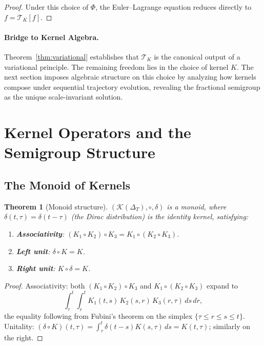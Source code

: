 \documentclass[12pt]{article}
\newtheorem{theorem}{Theorem}[section]
\newcommand{\Kcal}{\mathcal{K}}
\newcommand{\TK}{\mathcal{T}_K}
\begin{document}
\begin{proof}
Under this choice of $\Phi$, the Euler--Lagrange equation reduces directly
to $f = \TK[f]$.
\end{proof}

\paragraph{Bridge to Kernel Algebra.}
Theorem~\ref{thm:variational} establishes that $\TK$ is the canonical
output of a variational principle. The remaining freedom lies in the choice
of kernel $K$. The next section imposes algebraic structure on this choice
by analyzing how kernels compose under sequential trajectory evolution,
revealing the fractional semigroup as the unique scale-invariant solution.

\section{Kernel Operators and the Semigroup Structure}
\label{sec:semigroup}

\subsection{The Monoid of Kernels}

\begin{theorem}[Monoid structure]
\label{thm:monoid}
$(\Kcal(\Delta_T), \circ, \delta)$ is a monoid, where $\delta(t,\tau) =
\delta(t-\tau)$ (the Dirac distribution) is the identity kernel, satisfying:
\begin{enumerate}[label=(\roman*)]
\item \textbf{Associativity}: $(K_1 \circ K_2)\circ K_3 =
  K_1\circ(K_2\circ K_3)$.
\item \textbf{Left unit}: $\delta \circ K = K$.
\item \textbf{Right unit}: $K \circ \delta = K$.
\end{enumerate}
\end{theorem}

\begin{proof}
Associativity: both $(K_1\circ K_2)\circ K_3$ and $K_1\circ(K_2\circ K_3)$
expand to
\[
  \int_\tau^t\!\int_r^t K_1(t,s)\,K_2(s,r)\,K_3(r,\tau)\, ds\, dr,
\]
the equality following from Fubini's theorem on the simplex
$\{\tau \leq r \leq s \leq t\}$.
Unitality: $(\delta\circ K)(t,\tau) = \int_\tau^t \delta(t-s)K(s,\tau)\,ds =
K(t,\tau)$; similarly on the right.
\end{proof}
\end{document}
